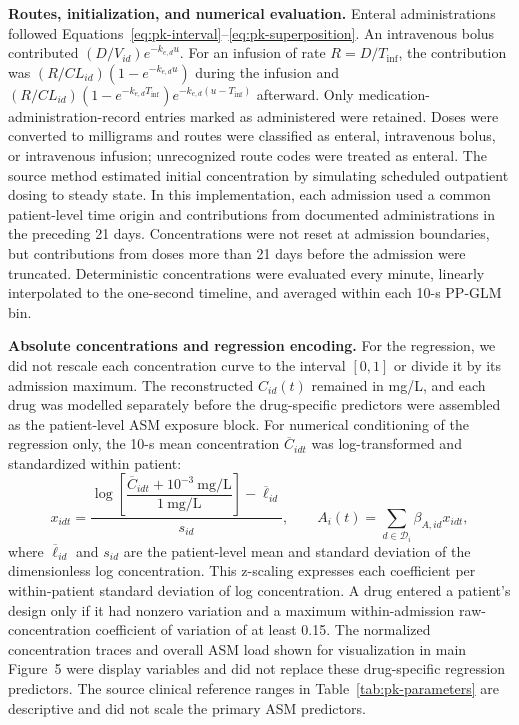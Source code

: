 \documentclass[11pt]{article}
\begin{document}
\textbf{Routes, initialization, and numerical evaluation.} Enteral administrations followed Equations~\ref{eq:pk-interval}--\ref{eq:pk-superposition}. An intravenous bolus contributed $(D/V_{id})e^{-k_{e,d}u}$. For an infusion of rate $R=D/T_{\mathrm{inf}}$, the contribution was $(R/CL_{id})(1-e^{-k_{e,d}u})$ during the infusion and $(R/CL_{id})(1-e^{-k_{e,d}T_{\mathrm{inf}}})e^{-k_{e,d}(u-T_{\mathrm{inf}})}$ afterward. Only medication-administration-record entries marked as administered were retained. Doses were converted to milligrams and routes were classified as enteral, intravenous bolus, or intravenous infusion; unrecognized route codes were treated as enteral. The source method estimated initial concentration by simulating scheduled outpatient dosing to steady state. In this implementation, each admission used a common patient-level time origin and contributions from documented administrations in the preceding 21 days. Concentrations were not reset at admission boundaries, but contributions from doses more than 21 days before the admission were truncated. Deterministic concentrations were evaluated every minute, linearly interpolated to the one-second timeline, and averaged within each 10-s PP-GLM bin.

\textbf{Absolute concentrations and regression encoding.} For the regression, we did not rescale each concentration curve to the interval $[0,1]$ or divide it by its admission maximum. The reconstructed $C_{id}(t)$ remained in mg/L, and each drug was modelled separately before the drug-specific predictors were assembled as the patient-level ASM exposure block. For numerical conditioning of the regression only, the 10-s mean concentration $\overline C_{idt}$ was log-transformed and standardized within patient:
\begin{equation}
x_{idt}=\frac{\log\!\left[\dfrac{\overline C_{idt}+10^{-3}\ \mathrm{mg/L}}{1\ \mathrm{mg/L}}\right]-\overline\ell_{id}}{s_{id}},
\qquad
A_i(t)=\sum_{d\in\mathcal D_i}\beta_{A,id}x_{idt},
\label{eq:asm-encoding}
\end{equation}
where $\overline\ell_{id}$ and $s_{id}$ are the patient-level mean and standard deviation of the dimensionless log concentration. This z-scaling expresses each coefficient per within-patient standard deviation of log concentration. A drug entered a patient's design only if it had nonzero variation and a maximum within-admission raw-concentration coefficient of variation of at least 0.15. The normalized concentration traces and overall ASM load shown for visualization in main Figure~5 were display variables and did not replace these drug-specific regression predictors. The source clinical reference ranges in Table~\ref{tab:pk-parameters} are descriptive and did not scale the primary ASM predictors.
\end{document}
